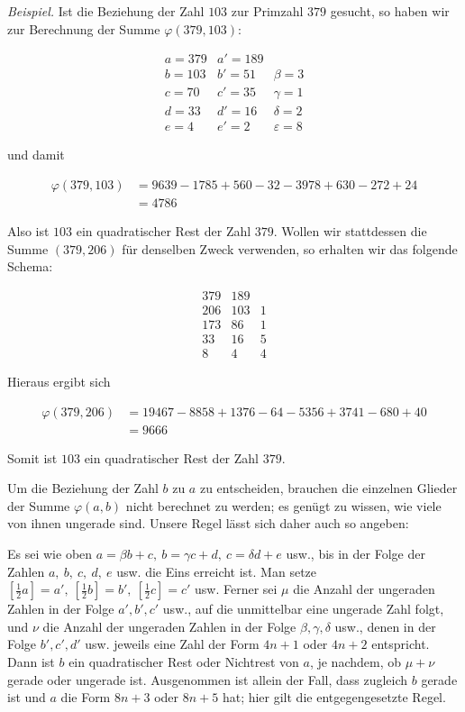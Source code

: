 \newpage
{}

\textit{Beispiel.} Ist die Beziehung der Zahl $103$ zur Primzahl $379$ gesucht, so haben wir zur Berechnung der Summe $\varphi(379,103)$:

\[
\begin{array}{r|r|l}
a=379&a'=189&\\
b=103&b'=51&\beta=3\\
c=70&c'=35&\gamma=1\\
d=33&d'=16&\delta=2\\
e=4&e'=2&\varepsilon=8
\end{array}
\]

und damit

\[
\begin{aligned}
\varphi(379,103)&=9639-1785+560-32-3978+630-272+24\\
&=4786
\end{aligned}
\]

Also ist $103$ ein quadratischer Rest der Zahl $379$. Wollen wir stattdessen die Summe $(379,206)$ für denselben Zweck verwenden, so erhalten wir das folgende Schema:

\[
\begin{array}{r|r|l}
379&189&\\
206&103&1\\
173&86&1\\
33&16&5\\
8&4&4
\end{array}
\]

Hieraus ergibt sich

%
\[
\begin{aligned}
\varphi(379,206)&=19467-8858+1376-64-5356+3741-680+40\\
&=9666
\end{aligned}
\]

Somit ist $103$ ein quadratischer Rest der Zahl $379$.


Um die Beziehung der Zahl $b$ zu $a$ zu entscheiden, brauchen die einzelnen Glieder der Summe $\varphi(a,b)$ nicht berechnet zu werden; es genügt zu wissen, wie viele von ihnen ungerade sind. Unsere Regel lässt sich daher auch so angeben:

Es sei wie oben $a=\beta b+c,\ b=\gamma c+d,\ c=\delta d+e$ usw., bis in der Folge der Zahlen $a,\ b,\ c,\ d,\ e$ usw. die Eins erreicht ist. Man setze $[\frac12a]=a',\ [\frac12b]=b',\ [\frac12c]=c'$ usw. Ferner sei $\mu$ die Anzahl der ungeraden Zahlen in der Folge $a',b',c'$ usw., auf die unmittelbar eine ungerade Zahl folgt, und $\nu$ die Anzahl der ungeraden Zahlen in der Folge $\beta,\gamma,\delta$ usw., denen in der Folge $b',c',d'$ usw. jeweils eine Zahl der Form $4n+1$ oder $4n+2$ entspricht. Dann ist $b$ ein quadratischer Rest oder Nichtrest von $a$, je nachdem, ob $\mu+\nu$ gerade oder ungerade ist. Ausgenommen ist allein der Fall, dass zugleich $b$ gerade ist und $a$ die Form $8n+3$ oder $8n+5$ hat; hier gilt die entgegengesetzte Regel.

